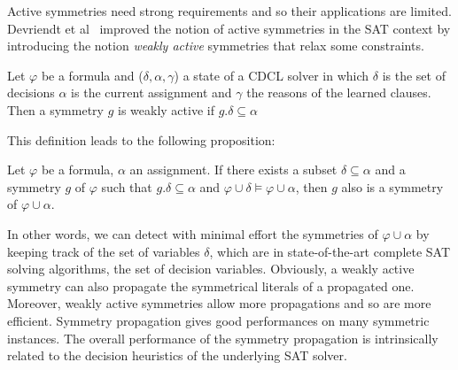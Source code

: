 Active symmetries need strong requirements and so their applications are limited.
Devriendt et al~\cite{Devriendt12} improved the notion of active symmetries in the SAT context by
introducing the notion \emph{weakly active} symmetries that relax some constraints.
\begin{definition}
 \label{def:weakly_active_symmetry}
 Let $\varphi$ be a formula and ($\delta, \alpha, \gamma$) a state of a CDCL solver in which $\delta$ is the set of decisions
 $\alpha$ is the current assignment and $\gamma$ the reasons of the learned clauses. Then a symmetry $g$ is weakly active 
 if $g.\delta \subseteq \alpha$
\end{definition}
This definition leads to the following proposition:
\begin{proposition}
 Let $\varphi$ be a formula, $\alpha $ an assignment. If
 there exists a subset $\delta \subseteq \alpha $ and a symmetry $g$ of $\varphi$ such that 
 $g.\delta \subseteq \alpha $ and $\varphi \cup \delta \models \varphi \cup \alpha$, then $g$ 
 also is a symmetry of $\varphi \cup \alpha $.
\end{proposition}

In other words, we can detect with minimal effort the symmetries of $\varphi
\cup \alpha$ by keeping track of the set of variables $\delta$, which are 
in state-of-the-art complete SAT solving algorithms, the set of decision variables.
Obviously, a weakly active symmetry can also propagate the symmetrical literals of a propagated one.
Moreover, weakly active symmetries allow more propagations and so are more efficient.
Symmetry propagation gives good performances on many symmetric instances.
The overall performance of the symmetry propagation is intrinsically related to the decision heuristics of the underlying SAT solver.
